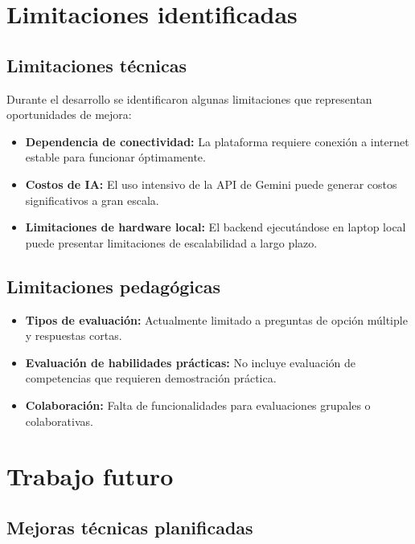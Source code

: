 \documentclass[12pt,a4paper]{report}
\begin{document}
\section{Limitaciones identificadas}

\subsection{Limitaciones técnicas}

Durante el desarrollo se identificaron algunas limitaciones que representan oportunidades de mejora:

\begin{itemize}
\item \textbf{Dependencia de conectividad:} La plataforma requiere conexión a internet estable para funcionar óptimamente.

\item \textbf{Costos de IA:} El uso intensivo de la API de Gemini puede generar costos significativos a gran escala.

\item \textbf{Limitaciones de hardware local:} El backend ejecutándose en laptop local puede presentar limitaciones de escalabilidad a largo plazo.
\end{itemize}

\subsection{Limitaciones pedagógicas}

\begin{itemize}
\item \textbf{Tipos de evaluación:} Actualmente limitado a preguntas de opción múltiple y respuestas cortas.

\item \textbf{Evaluación de habilidades prácticas:} No incluye evaluación de competencias que requieren demostración práctica.

\item \textbf{Colaboración:} Falta de funcionalidades para evaluaciones grupales o colaborativas.
\end{itemize}

\section{Trabajo futuro}

\subsection{Mejoras técnicas planificadas}
\end{document}
